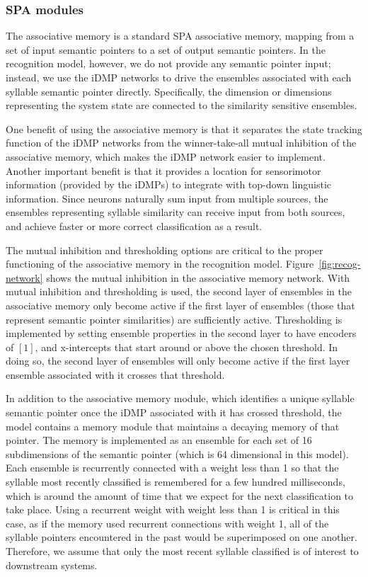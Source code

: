 \subsubsection{SPA modules}

The associative memory is a standard
SPA associative memory,
mapping from a set of input semantic pointers
to a set of output semantic pointers.
In the recognition model, however,
we do not provide any semantic pointer input;
instead, we use the iDMP networks
to drive the ensembles associated
with each syllable semantic pointer directly.
Specifically, the dimension or dimensions
representing the system state
are connected to the similarity sensitive ensembles.

One benefit of using the associative memory
is that it separates the state tracking function
of the iDMP networks
from the winner-take-all mutual inhibition
of the associative memory,
which makes the iDMP network easier to implement.
Another important benefit is that
it provides a location for
sensorimotor information
(provided by the iDMPs)
to integrate with top-down
linguistic information.
Since neurons naturally sum
input from multiple sources,
the ensembles representing syllable similarity
can receive input from both sources,
and achieve faster or more correct classification
as a result.

The mutual inhibition and thresholding options
are critical to the proper functioning
of the associative memory
in the recognition model.
Figure~\ref{fig:recog-network} shows
the mutual inhibition in the associative memory network.
With mutual inhibition and thresholding is used,
the second layer of ensembles
in the associative memory
only become active if
the first layer of ensembles
(those that represent semantic pointer similarities)
are sufficiently active.
Thresholding is implemented by
setting ensemble properties in the second layer
to have encoders of $[1]$,
and x-intercepts that start around or above
the chosen threshold.
In doing so, the second layer of ensembles
will only become active if the
first layer ensemble associated with it
crosses that threshold.

In addition to the associative memory module,
which identifies a unique syllable semantic pointer
once the iDMP associated with it has crossed threshold,
the model contains a memory module
that maintains a decaying memory
of that pointer.
The memory is implemented as an ensemble
for each set of 16 subdimensions
of the semantic pointer
(which is 64 dimensional in this model).
Each ensemble is recurrently connected
with a weight less than 1
so that the syllable most recently classified
is remembered for a few hundred milliseconds,
which is around the amount of time that we expect
for the next classification to take place.
Using a recurrent weight
with weight less than 1
is critical in this case,
as if the memory used recurrent connections
with weight 1,
all of the syllable pointers
encountered in the past would be
superimposed on one another.
Therefore, we assume that
only the most recent syllable classified
is of interest to downstream systems.

